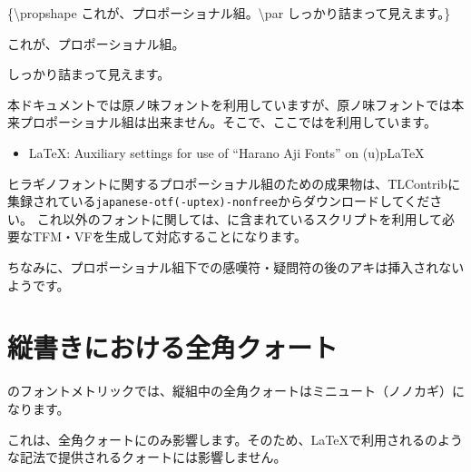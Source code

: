 \documentclass[../otf-unofficial-guide]{subfiles}
\begin{document}
\begin{demosource}[0.4]
  \{{\textbackslash}propshape\textvisiblespace
  これが、プロポーショナル組。{\textbackslash}par\textvisiblespace
  しっかり詰まって見えます。\}
  \tcblower
  {\propshape これが、プロポーショナル組。\par
  しっかり詰まって見えます。}
\end{demosource}

本ドキュメントでは原ノ味フォントを利用していますが、原ノ味フォントでは本来プロポーショナル組は出来ません。そこで、ここではを利用しています。

\begin{itemize}
  \item LaTeX: Auxiliary settings for use of ``Harano Aji Fonts'' on (u)pLaTeX
\end{itemize}

ヒラギノフォントに関するプロポーショナル組のための成果物は、TLContribに集録されている\texttt{japanese-otf(-uptex)-nonfree}からダウンロードしてください。
これ以外のフォントに関しては、に含まれているスクリプトを利用して必要なTFM・VFを生成して対応することになります。

ちなみに、プロポーショナル組下での感嘆符・疑問符の後のアキは挿入されないようです。

\section{縦書きにおける全角クォート}

のフォントメトリックでは、縦組中の全角クォートはミニュート（ノノカギ）になります。


これは、全角クォートにのみ影響します。そのため、\LaTeX{}で利用される\texttt{\textasciigrave\nobreakspace\textquotesingle}のような記法で提供されるクォートには影響しません。

\end{document}
